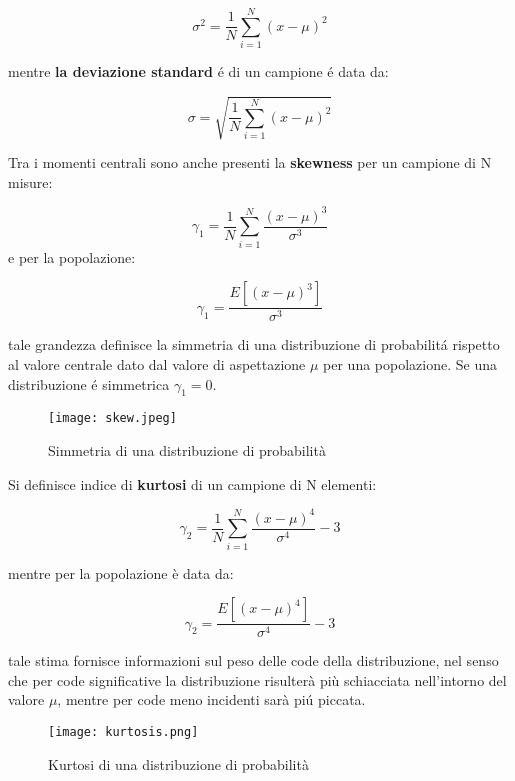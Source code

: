 \documentclass[11pt,a4paper]{book}
\begin{document}
\begin{equation}
	\sigma^2 = \dfrac{1}{N}\sum_{i=1}^N(x- \mu)^2
\end{equation}

mentre \textbf{la deviazione standard} \'{e} di un campione \'{e} data da:

\begin{equation}
	\sigma = \sqrt{\dfrac{1}{N}\sum_{i=1}^N(x- \mu)^2}
\end{equation}

Tra i momenti centrali sono anche presenti la \textbf{skewness} per un campione di N misure:

\begin{equation}
	\gamma_{1} = \dfrac{1}{N}\sum_{i=1}^N \dfrac{(x-\mu)^3}{\sigma^3}
\end{equation}
 e per la popolazione:
 
 \begin{equation}
 	\gamma_{1} = \dfrac{E[(x-\mu)^3]}{\sigma^3}
 \end{equation}
 
 tale grandezza definisce la simmetria di una distribuzione di probabilit\'{a} rispetto al valore centrale dato dal valore di aspettazione $\mu$ per una popolazione. Se una distribuzione \'{e} simmetrica $\gamma_{1} = 0 $.
 
  
\begin{figure}[!ht]

\texttt{[image: skew.jpeg]}	
\centering
\caption{Simmetria di una distribuzione di probabilit\`{a}}
\end{figure}


Si definisce indice di \textbf{kurtosi} di un campione di N elementi:

\begin{equation}
	\gamma_{2} = \dfrac{1}{N}\sum_{i=1}^N\dfrac{(x-\mu)^4}{\sigma^4}-3
\end{equation}

mentre per la popolazione \`{e} data da:

\begin{equation}
	\gamma_2 = \dfrac{E[(x-\mu)^4]}{\sigma^4} -3
\end{equation}

tale stima fornisce informazioni sul peso delle code della distribuzione, nel senso che per code significative la distribuzione risulter\`{a} pi\`{u} schiacciata nell'intorno del valore $\mu$, mentre per code meno incidenti sar\`{a} pi\'{u} piccata.


\begin{figure}[!ht]

\texttt{[image: kurtosis.png]}	
\centering
\caption{Kurtosi di una distribuzione di probabilit\`{a}}
\end{figure}
\end{document}
